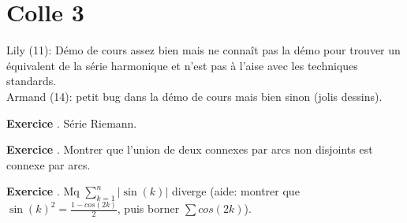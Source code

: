 \documentclass[10pt,a4paper]{article}
\newcounter{question}
\newcounter{exo}
\newenvironment{exo}{\vspace{0.5cm}\setcounter{question}{0}\addtocounter{exo}{1} \noindent \textbf{Exercice \theexo}. \normalsize }{\par}
\begin{document}
	\section*{Colle 3}
	\setcounter{exo}{0}
	Lily (11): Démo de cours assez bien mais ne connaît pas la démo pour trouver un équivalent de la série harmonique et n'est pas à l'aise avec les techniques standards.\\
	Armand (14): petit bug dans la démo de cours mais bien sinon (jolis dessins).\\
	
	\begin{exo}
		Série Riemann.
	\end{exo}

	\begin{exo}
		Montrer que l’union de deux connexes par arcs non disjoints est connexe par arcs.
	\end{exo}
	\begin{exo}
		Mq $\sum_{k=1}^{n} \vert \sin(k) \vert$ diverge (aide: montrer que $\sin(k)^2 = \frac{1 - cos(2k)}{2}$, puis borner $\sum cos(2k)$).
	\end{exo}
\end{document}
